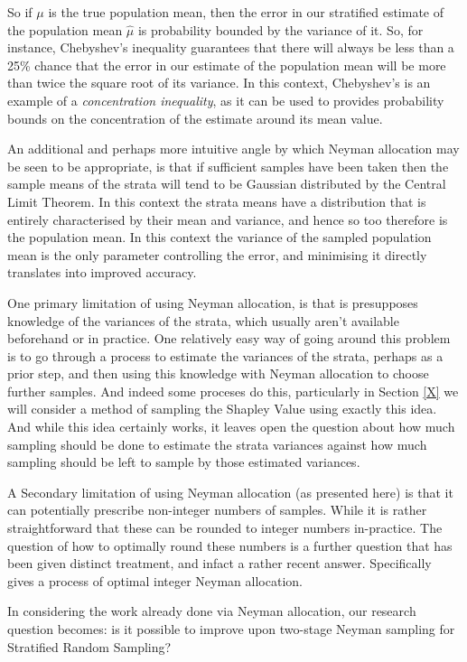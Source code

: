 So if $\mu$ is the true population mean, then the error in our stratified estimate of the population mean $\hat{\mu}$ is probability bounded by the variance of it.
So, for instance, Chebyshev's inequality guarantees that there will always be less than a 25\% chance that the error in our estimate of the population mean will be more than twice the square root of its variance.
In this context, Chebyshev's is an example of a \textit{concentration inequality}, as it can be used to provides probability bounds on the concentration of the estimate around its mean value.

An additional and perhaps more intuitive angle by which Neyman allocation may be seen to be appropriate, is that if sufficient samples have been taken then the sample means of the strata will tend to be Gaussian distributed by the Central Limit Theorem.
In this context the strata means have a distribution that is entirely characterised by their mean and variance, and hence so too therefore is the population mean.
In this context the variance of the sampled population mean is the only parameter controlling the error, and minimising it directly translates into improved accuracy.

One primary limitation of using Neyman allocation, is that is presupposes knowledge of the variances of the strata, which usually aren't available beforehand or in practice.
One relatively easy way of going around this problem is to go through a process to estimate the variances of the strata, perhaps as a prior step, and then using this knowledge with Neyman allocation to choose further samples.
And indeed some proceses do this, particularly in Section \ref{X} we will consider a method of sampling the Shapley Value using exactly this idea.
And while this idea certainly works, it leaves open the question about how much sampling should be done to estimate the strata variances against how much sampling should be left to sample by those estimated variances.

A Secondary limitation of using Neyman allocation (as presented here) is that it can potentially prescribe non-integer numbers of samples. While it is rather straightforward that these can be rounded to integer numbers in-practice. The question of how to optimally round these numbers is a further question that has been given distinct treatment, and infact a rather recent answer.
Specifically \cite{WRIGHT201750} gives a process of optimal integer Neyman allocation.

In considering the work already done via Neyman allocation, our research question becomes:
is it possible to improve upon two-stage Neyman sampling for Stratified Random Sampling?


